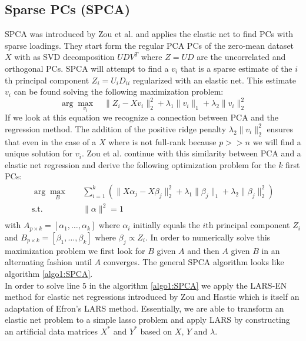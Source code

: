 \documentclass[11pt,letterpaper]{report}
\begin{document}
\subsection*{Sparse PCs (SPCA)}
SPCA was introduced by Zou et al. \cite{Zou2006} and applies the elastic net to find PCs with sparse loadings. They start form the regular PCA PCs of the zero-mean dataset $X$ with as SVD decomposition $UDV^T$ where $Z=UD$ are the uncorrelated and orthogonal PCs. SPCA will attempt to find a $v_i$ that is a sparse estimate of the $i$th principal component $Z_i = U_iD_{ii}$ regularized with an elastic net. This estimate $v_i$ can be found solving the following maximization problem:
\begin{equation*}
\arg\max_{v_{i}} \quad \|Z_i - X v_i\|_2^2 + \lambda_1\|v_i\|_1 + \lambda_2\|v_i\|_2^2
\end{equation*}
If we look at this equation we recognize a connection between PCA and the regression method. The addition of the positive ridge penalty $\lambda_2\|v_i\|_2^2$ ensures that even in the case of a $X$ where is not full-rank because $p>>n$ we will find a unique solution for $v_i$. Zou et al. continue with this similarity between PCA and a elastic net regression and derive the following optimization problem for the $k$ first PCs:
\begin{equation*}
\begin{aligned}
\arg\max_{B} \quad & \sum_{i=1}^{k} \left(\|X\alpha_j-X\beta_j\|_2^2 +\lambda_1 \|\beta_j\|_1 + \lambda_2\|\beta_j\|_2^2\right)\\
\textrm{s.t.} \quad & \|\alpha\|^2 = 1\\
\end{aligned}
\end{equation*}
with $A_{p\times k} = [\alpha_1,\ldots,\alpha_k]$ where $\alpha_i$ initially equals the $i$th principal component $Z_i$ and $B_{p\times k} = [\beta_1,\ldots,\beta_k]$ where $\beta_j\propto Z_i$. In order to numerically solve this maximization problem we first look for $B$ given $A$ and then $A$ given $B$ in an alternating fashion until $A$ converges. The general SPCA algorithm looks like algorithm \ref{algo1:SPCA}.\\

In order to solve line $5$ in the algorithm \ref{algo1:SPCA} we apply the LARS-EN method for elastic net regressions introduced by Zou and Hastie \cite{Zou2005} which is itself an adaptation of Efron's \citeyear{Efron2004} LARS method. Essentially, we are able to transform an elastic net problem to a simple lasso problem and apply LARS by constructing an artificial data matrices $X^*$ and $Y^*$ based on $X$, $Y$ and $\lambda$.
\end{document}
